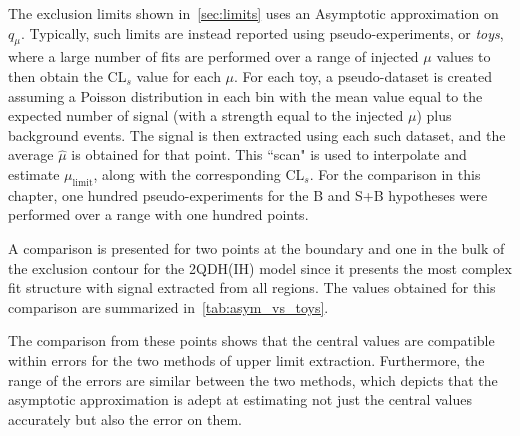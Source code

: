 The exclusion limits shown in~\cref{sec:limits} uses an Asymptotic approximation on $q_\mu$. Typically, such limits are instead reported using pseudo-experiments, or \textit{toys}, where a large number of fits are performed over a range of injected $\mu$ values to then obtain the CL$_s$ value for each $\mu$. For each toy, a pseudo-dataset is created assuming a Poisson distribution in each bin with the mean value equal to the expected number of signal (with a strength equal to the injected $\mu$) plus background events. The signal is then extracted using each such dataset, and the average $\hat{\mu}$ is obtained for that point. This ``scan" is used to interpolate and estimate $\mu_\mathrm{limit}$, along with the corresponding CL$_s$. For the comparison in this chapter, one hundred pseudo-experiments for the B and S+B hypotheses were performed over a range with one hundred points.

A comparison is presented for two points at the boundary and one in the bulk of the exclusion contour for the 2QDH(IH) model since it presents the most complex fit structure with signal extracted from all regions. The values obtained for this comparison are summarized in~\cref{tab:asym_vs_toys}.

\begin{table}[!ht]
    \centering
    \caption{Comparisons of the observed and expected limits and the errors on the expected limits obtained using the asymptotic approximation and toys for three representative HNL points in the 2QDH(IH) model. The $+2\sigma$ value is not obtained with toys for some samples and is shown using a dash (-).}
    \label{tab:asym_vs_toys}
\end{table}

The comparison from these points shows that the central values are compatible within errors for the two methods of upper limit extraction. Furthermore, the range of the errors are similar between the two methods, which depicts that the asymptotic approximation is adept at estimating not just the central values accurately but also the error on them.